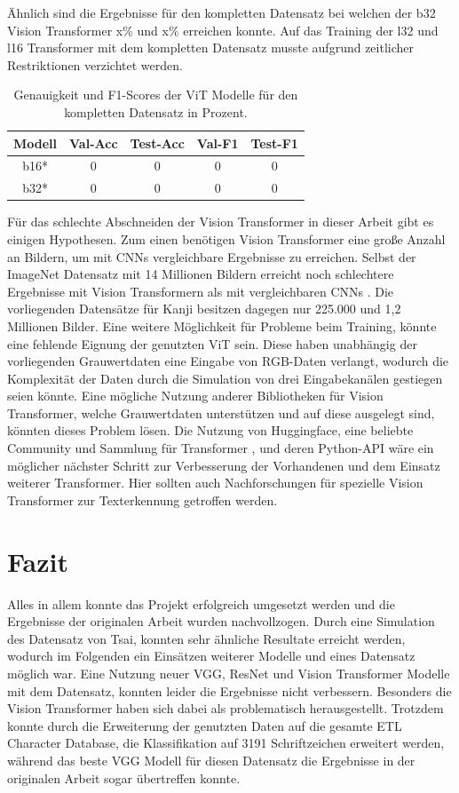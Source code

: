 \documentclass[twoside,a4paper]{IEEEtran}
\begin{document}
Ähnlich sind die Ergebnisse für den kompletten Datensatz bei welchen der b32 Vision Transformer x\% und x\% erreichen konnte. Auf das Training der l32 und l16 Transformer mit dem kompletten Datensatz musste aufgrund zeitlicher Restriktionen verzichtet werden.
\begin{table}[!htb]
	\caption{Genauigkeit und F1-Scores der ViT Modelle für den kompletten Datensatz in Prozent.}
	\label{vit_ergebnis_full}
	\centering
	\begin{tabular}{|c|c|c|c|c|}
		\hline
		Modell & Val-Acc & Test-Acc & Val-F1 & Test-F1\\
		\hline
		\hline 
		b16* & 0 & 0 & 0 & 0\\
		\hline
		b32* & 0 & 0 & 0 & 0\\
		\hline 
	\end{tabular}
\end{table}

Für das schlechte Abschneiden der Vision Transformer in dieser Arbeit gibt es einigen Hypothesen. Zum einen benötigen Vision Transformer eine große Anzahl an Bildern, um mit CNNs vergleichbare Ergebnisse zu erreichen. Selbst der ImageNet Datensatz mit 14 Millionen Bildern \cite{IMAGENET} erreicht noch schlechtere Ergebnisse mit Vision Transformern als mit vergleichbaren CNNs \cite{JFT}. Die vorliegenden Datensätze für Kanji besitzen dagegen nur 225.000 und 1,2 Millionen Bilder. Eine weitere Möglichkeit für Probleme beim Training, könnte eine fehlende Eignung der genutzten ViT sein. Diese haben unabhängig der vorliegenden Grauwertdaten eine Eingabe von RGB-Daten verlangt, wodurch die Komplexität der Daten durch die Simulation von drei Eingabekanälen gestiegen seien könnte. Eine mögliche Nutzung anderer Bibliotheken für Vision Transformer, welche Grauwertdaten unterstützen und auf diese ausgelegt sind, könnten dieses Problem lösen. Die Nutzung von Huggingface, eine beliebte Community und Sammlung für Transformer \cite{huggingface}, und deren Python-API wäre ein möglicher nächster Schritt zur Verbesserung der Vorhandenen und dem Einsatz weiterer Transformer. Hier sollten auch Nachforschungen für spezielle Vision Transformer zur Texterkennung getroffen werden. 

\section{Fazit} %
Alles in allem konnte das Projekt erfolgreich umgesetzt werden und die Ergebnisse der originalen Arbeit wurden nachvollzogen. Durch eine Simulation des Datensatz von Tsai, konnten sehr ähnliche Resultate erreicht werden, wodurch im Folgenden ein Einsätzen weiterer Modelle und eines Datensatz möglich war. Eine Nutzung neuer VGG, ResNet und Vision Transformer Modelle mit dem Datensatz, konnten leider die Ergebnisse nicht verbessern. Besonders die Vision Transformer haben sich dabei als problematisch herausgestellt. Trotzdem konnte durch die Erweiterung der genutzten Daten auf die gesamte ETL Character Database, die Klassifikation auf 3191 Schriftzeichen erweitert werden, während das beste VGG Modell für diesen Datensatz die Ergebnisse in der originalen Arbeit sogar übertreffen konnte.
\end{document}

